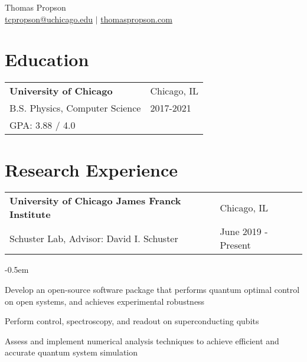 \documentclass[letterpaper, 12pt]{article}
\let\olditemize=\itemize
\let\endolditemize=\enditemize
\renewenvironment{itemize}{\olditemize \itemsep-0.5em}
                 {\endolditemize}
\begin{document}
\begin{center}
{\huge Thomas Propson} \\[5pt]
\href{mailto:tcpropson@uchicago.edu}{tcpropson@uchicago.edu} $\vert$
\href{https://thomaspropson.com}{thomaspropson.com}
\end{center}


\flushleft

\section{Education}
\begin{tabular}{@{} L{12cm} @{} R{4.51cm} @{}}
  \textbf{University of Chicago} & Chicago, IL \\
  B.S. Physics, Computer Science & 2017-2021\\
  GPA: 3.88 / 4.0 & \\
\end{tabular}
\vspace{2pt}


\section{Research Experience}
\begin{tabular}{@{} L{12cm} @{} R{4.51cm} @{}}
  \textbf{University of Chicago James Franck Institute} & Chicago, IL \\
  Schuster Lab, Advisor: David I. Schuster & June 2019 - Present \\
\end{tabular}
\vspace{-1.4em}
\begin{itemize}
  \item Develop an open-source software package that performs quantum optimal control
        on open systems, and achieves experimental robustness
  \item Perform control, spectroscopy, and readout on superconducting qubits
  \item Assess and implement numerical analysis techniques to achieve efficient and accurate quantum
        system simulation
\end{itemize}
\vspace{-0.5em}
\end{document}
